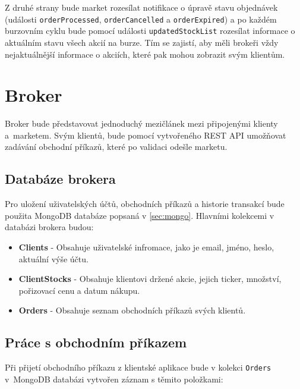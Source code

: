 \documentclass[thesis=M,czech]{FITthesis}[2012/06/26]
\begin{document}
	Z druhé strany bude market rozesílat notifikace o úpravě stavu objednávek (události \texttt{orderProcessed}, \texttt{orderCancelled} a \texttt{orderExpired}) a po každém burzovním cyklu bude pomocí události \texttt{updatedStockList} rozesílat informace o aktuálním stavu všech akcií na burze. Tím se zajistí, aby měli brokeři vždy nejaktuálnější informace o akciích, které pak mohou zobrazit svým klientům.
	
\section{Broker}

	Broker bude představovat jednoduchý mezičlánek mezi připojenými klienty a~marketem. Svým klientů, bude pomocí vytvořeného REST API umožňovat zadávání obchodní příkazů, které po validaci odešle marketu.
	
\subsection{Databáze brokera}
	
	Pro uložení uživatelských účtů, obchodních příkazů a historie transakcí bude použita MongoDB databáze popsaná v \ref{sec:mongo}. Hlavními kolekcemi v databázi brokera budou:

\begin{itemize}

\item \textbf{Clients} - Obsahuje uživatelské infromace, jako je email, jméno, heslo, aktuální výše účtu.

\item \textbf{ClientStocks} - Obsahuje klientovi držené akcie, jejich ticker, množství, pořizovací cenu a datum nákupu.

\item \textbf{Orders} - Obsahuje seznam obchodních příkazů svých klientů.

\end{itemize}
		
\subsection{Práce s obchodním příkazem}
	
	Při přijetí obchodního příkazu z klientské aplikace bude v kolekci \texttt{Orders} v~MongoDB databázi vytvořen záznam s těmito položkami:
	
\end{document}
